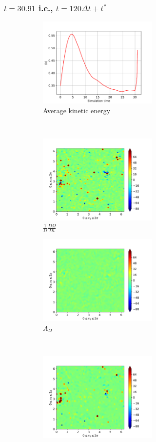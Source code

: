 \subsubsection{$t=30.91$ i.e., $t=120\Delta t + t^{\ast}$}
\begin{figure}[H]
    \begin{subfigure}[H]{0.45\textwidth}
        \includegraphics[height=1.75in]{media/run-cds-65/ke-average1440}
        \caption{Average kinetic energy}
    \end{subfigure}
    ~
    \begin{subfigure}[H]{0.45\textwidth}
        \includegraphics[height=1.75in]{media/run-cds-65/enst-1440}
        \caption{$\frac{1}{\Omega} \frac{D \Omega}{Dt}$}
    \end{subfigure}
    \newline
    \begin{subfigure}{0.45\textwidth}
        \includegraphics[height=1.75in]{media/run-cds-65/A-enst-1440}
        \caption{$A_{\Omega}$}
    \end{subfigure}
    ~
    \begin{subfigure}{0.45\textwidth}
        \includegraphics[height=1.75in]{media/run-cds-65/Pi-enst-1440}

\end{subfigure}
\end{figure}
